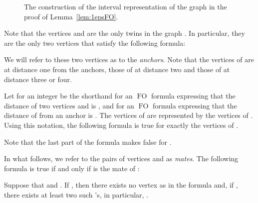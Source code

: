 \documentclass{CSML}
\newcommand{\FO}{\ensuremath{\operatorname{FO}}\xspace}
\theoremstyle{plain}\newtheorem{claim}[thm]{Claim}
\begin{document}
\begin{figure}[tb]
\begin{center}
\end{center}
\caption{The construction of the interval representation of the graph  in the proof of Lemma~\ref{lem:1epsFO}.}
\label{fig:dense1hardness}
\end{figure}

Note that the vertices  and  are the only twins in the graph .
In particular, they are the only two vertices that satisfy the following formula:

We will refer to these two vertices as to the {\em anchors}.
Note that the vertices of  are at distance one from the anchors,
those of  at distance two and
those of  at distance three or four.

Let  for an integer  be the shorthand for an \FO formula expressing that the distance of two vertices  and  is , and
 for an \FO formula expressing that the distance of  from an anchor is .
The vertices of  are represented by the vertices of .
Using this notation, the following formula is true for exactly the vertices of .

Note that the last part of the formula makes  false for .

In what follows, we refer to the pairs of vertices  and  as \emph{mates}.
The following formula is true if and only if  is the mate of :

Suppose that  and .
If , then there exists no vertex  as in the formula and,
if , there exists at least two such 's, in particular, .
\end{document}
